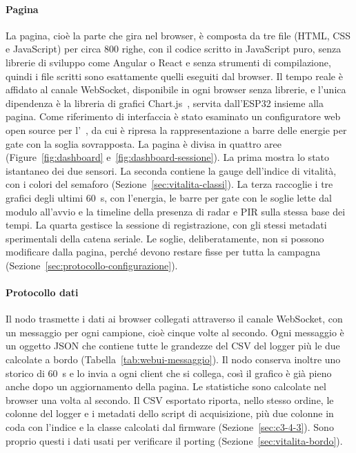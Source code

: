 \paragraph{Pagina} La pagina, cioè la parte che gira nel browser, è composta da tre file
(HTML, CSS e JavaScript) per circa 800 righe, con il codice scritto in JavaScript puro,
senza librerie di sviluppo come Angular o React e senza strumenti di compilazione, quindi
i file scritti sono esattamente quelli eseguiti dal browser. Il tempo reale è affidato al
canale WebSocket, disponibile in ogni browser senza librerie, e l'unica dipendenza è la
libreria di grafici Chart.js~\cite{chartjs}, servita dall'ESP32 insieme alla pagina. Come
riferimento di interfaccia è stato esaminato un configuratore web open source per
l'\ldb~\cite{ld2410configurator}, da cui è ripresa la rappresentazione a barre delle
energie per gate con la soglia sovrapposta. La pagina è divisa in quattro aree
(Figure~\ref{fig:dashboard} e~\ref{fig:dashboard-sessione}). La prima
mostra lo stato istantaneo dei due sensori. La seconda contiene la gauge dell'indice di
vitalità, con i colori del semaforo (Sezione~\ref{sec:vitalita-classi}). La terza
raccoglie i tre grafici degli ultimi 60~s, con l'energia, le barre per gate con le soglie
lette dal modulo all'avvio e la timeline della presenza di radar e PIR sulla stessa base
dei tempi. La quarta gestisce la sessione di registrazione, con gli stessi metadati
sperimentali della catena seriale. Le soglie, deliberatamente, non si possono modificare
dalla pagina, perché devono restare fisse per tutta la campagna
(Sezione~\ref{sec:protocollo-configurazione}).

\paragraph{Protocollo dati} Il nodo trasmette i dati ai browser collegati attraverso il
canale WebSocket, con un messaggio per ogni campione, cioè cinque volte al secondo. Ogni
messaggio è un oggetto JSON che contiene tutte le grandezze del CSV del logger più le due
calcolate a bordo (Tabella~\ref{tab:webui-messaggio}). Il nodo conserva inoltre uno storico
di 60~s e lo invia a ogni client che si collega, così il grafico è già pieno anche dopo un
aggiornamento della pagina. Le statistiche sono calcolate nel browser una volta al secondo.
Il CSV esportato riporta, nello stesso ordine, le colonne del logger e i metadati dello
script di acquisizione, più due colonne in coda con l'indice e la classe calcolati dal
firmware (Sezione~\ref{sec:c3-4-3}). Sono proprio questi i dati usati per verificare il
porting (Sezione~\ref{sec:vitalita-bordo}).

